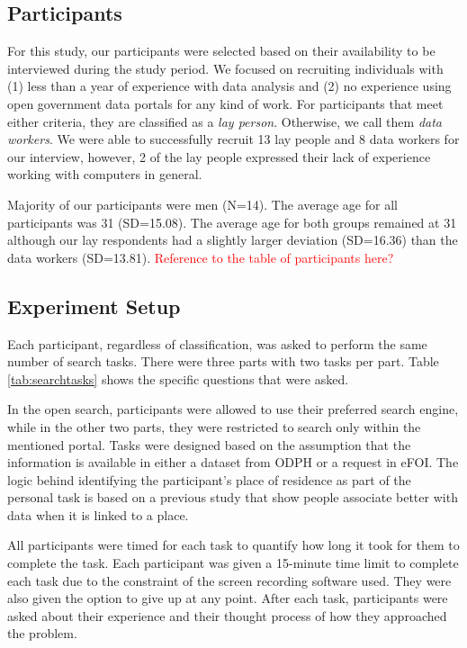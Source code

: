 \documentclass{sigchi}
\begin{document}
\subsection{Participants}
For this study, our participants were selected based on their availability to be interviewed during the study period. We focused on recruiting individuals with (1) less than a year of experience with data analysis and (2) no experience using open government data portals for any kind of work. For participants that meet either criteria, they are classified as a \textit{lay person}. Otherwise, we call them \textit{data workers}. We were able to successfully recruit 13 lay people and 8 data workers for our interview, however, 2 of the lay people expressed their lack of experience working with computers in general. 

Majority of our participants were men (N=14). The average age for all participants was 31 (SD=15.08). The average age for both groups remained at 31 although our lay respondents had a slightly larger deviation (SD=16.36) than the data workers (SD=13.81). \textcolor{red}{Reference to the table of participants here?}

\subsection{Experiment Setup}
Each participant, regardless of classification, was asked to perform the same number of search tasks. There were three parts with two tasks per part. Table \ref{tab:searchtasks} shows the specific questions that were asked. 

In the open search, participants were allowed to use their preferred search engine, while in the other two parts, they were restricted to search only within the mentioned portal. Tasks were designed based on the assumption that the information is available in either a dataset from ODPH or a request in eFOI. The logic behind identifying the participant's place of residence as part of the personal task is based on a previous study \cite{puussaar2018making} that show people associate better with data when it is linked to a place.

All participants were timed for each task to quantify how long it took for them to complete the task. Each participant was given a 15-minute time limit to complete each task due to the constraint of the screen recording software used. They were also given the option to give up at any point. After each task, participants were asked about their experience and their thought process of how they approached the problem.
\end{document}

